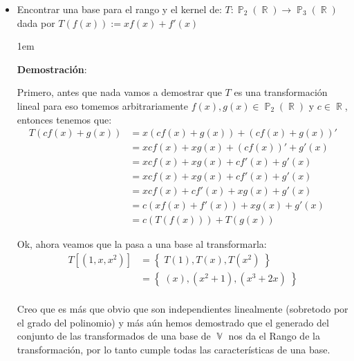 \documentclass[12pt, fleqn]{article}                             %
\newenvironment{SmallIndentation}[1][0.75em]                    %
        {\begin{adjustwidth}{#1}{}\begin{footnotesize}}             %
        {\end{footnotesize}\end{adjustwidth}}                       %
\theoremstyle{break}                                            %
\DeclareMathOperator \Reals        {\mathbb{R}}                 %
\DeclareMathOperator \VectorSet    {\mathbb{V}}                 %
\DeclareMathOperator \Polynomials  {\mathbb{P}}                 %
\newcommand{\Set}[1]    {\left\{ \; #1 \; \right\}}             %
\newcommand{\Brackets}[1]    {\left[ #1 \right]}                %
\newcommand{\Wrap}[1]    {\left( #1 \right)}                    %
\begin{document}
        \begin{itemize}

            \item
                Encontrar una base para el rango y el kernel de:
                $T: \Polynomials_2(\Reals) \to \Polynomials_3(\Reals)$
                dada por $T(f(x)) := xf(x) + f'(x)$

                \begin{SmallIndentation}[1em]
                    \textbf{Demostración}:
                    
                    Primero, antes que nada vamos a demostrar que $T$ es una transformación lineal
                    para eso tomemos arbitrariamente $f(x), g(x) \in \Polynomials_2(\Reals)$
                    y $c \in \Reals$, entonces tenemos que:
                    \begin{align*}
                        T(cf(x) + g(x))
                            &= x(cf(x) + g(x)) + (cf(x) + g(x))'         \\
                            &= xcf(x) + xg(x) + (cf(x))' + g'(x)         \\
                            &= xcf(x) + xg(x) + cf'(x) + g'(x)           \\
                            &= xcf(x) + xg(x) + cf'(x) + g'(x)           \\
                            &= xcf(x) + cf'(x) + xg(x) + g'(x)           \\
                            &= c(xf(x) + f'(x)) + xg(x) + g'(x)          \\
                            &= c(T(f(x))) + T(g(x))
                    \end{align*}

                    Ok, ahora veamos que la pasa a una base al transformarla:
                    \begin{align*}
                        T\Brackets{\Wrap{1, x, x^2}}
                            &= \Set{T(1), T(x), T(x^2)}             \\ 
                            &= \Set{(x), (x^2 + 1), (x^3 + 2x)}     \\ 
                    \end{align*}

                    Creo que es más que obvio que son independientes linealmente (sobretodo por el grado
                    del polinomio)
                    y más aún hemos demostrado que el generado del conjunto de las transformados
                    de una base de $\VectorSet$ nos da el Rango de la transformación, por lo tanto
                    cumple todas las características de una base.


\end{SmallIndentation}
\end{itemize}
\end{document}
